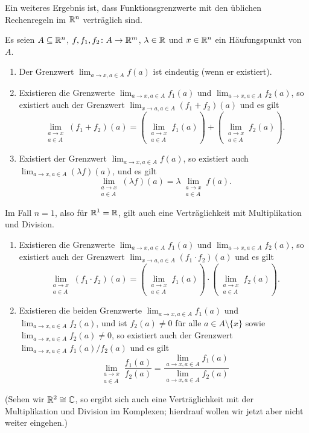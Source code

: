 \documentclass[a4paper,10pt]{article}
\begin{document}
Ein weiteres Ergebnis ist, dass Funktionsgrenzwerte mit den üblichen Rechenregeln im $\mathbb{R}^n$ verträglich sind.


\begin{prop}
 Es seien $A \subseteq \mathbb{R}^n$, $f, f_1, f_2 \colon A \to \mathbb{R}^m$, $\lambda \in \mathbb{R}$ und $x \in \mathbb{R}^n$ ein Häufungspunkt von $A$.
 \begin{enumerate}
  \item
   Der Grenzwert $\lim_{a \to x, a \in A} f(a)$ ist eindeutig (wenn er existiert).
  \item
   Existieren die Grenzwerte $\lim_{a \to x, a \in A} f_1(a)$ und $\lim_{a \to x, a \in A} f_2(a)$, so existiert auch der Grenzwert $\lim_{x \to a, a \in A} (f_1 + f_2)(a)$ und es gilt
   \[
    \lim_{\substack{a \to x \\ a \in A}} (f_1 + f_2)(a)
    =
    \left( \lim_{\substack{a \to x \\ a \in A}} f_1(a) \right)
    + \left( \lim_{\substack{a \to x \\ a \in A}} f_2(a) \right).
   \]
  \item
   Existiert der Grenzwert $\lim_{a \to x, a \in A} f(a)$, so existiert auch $\lim_{a \to x, a \in A} (\lambda f)(a)$, und es gilt
   \[
    \lim_{\substack{a \to x \\ a \in A}} (\lambda f)(a)
    = \lambda \lim_{\substack{a \to x \\ a \in A}} f(a).
   \]
 \end{enumerate}
 Im Fall $n = 1$, also für $\mathbb{R}^1 = \mathbb{R}$, gilt auch eine Verträglichkeit mit Multiplikation und Division.
 \begin{enumerate}[resume]
  \item
   Existieren die Grenzwerte $\lim_{a \to x, a \in A} f_1(a)$ und $\lim_{a \to x, a \in A} f_2(a)$, so existiert auch der Grenzwert $\lim_{x \to a, a \in A} (f_1 \cdot f_2)(a)$ und es gilt
   \[
    \lim_{\substack{a \to x \\ a \in A}} (f_1 \cdot f_2)(a)
    =
    \left( \lim_{\substack{a \to x \\ a \in A}} f_1(a) \right)
    \cdot \left( \lim_{\substack{a \to x \\ a \in A}} f_2(a) \right).
   \]
  \item
   Existieren die beiden Grenzwerte $\lim_{a \to x, a \in A} f_1(a)$ und $\lim_{a \to x, a \in A} f_2(a)$, und ist \mbox{$f_2(a) \neq 0$} für alle $a \in A \setminus \{x\}$ sowie $\lim_{a \to x, a \in A} f_2(a) \neq 0$, so existiert auch der Grenzwert $\lim_{a \to x, a \in A} f_1(a)/f_2(a)$ und es gilt
   \[
    \lim_{\substack{a \to x \\ a \in A}} \frac{f_1(a)}{f_2(a)}
    = \frac{\lim_{a \to x, a \in A} f_1(a)}{\lim_{a \to x, a \in A} f_2(a)}
   \]
 \end{enumerate}
 (Sehen wir $\mathbb{R}^2 \cong \mathbb{C}$, so ergibt sich auch eine Verträglichkeit mit der Multiplikation und Division im Komplexen; hierdrauf wollen wir jetzt aber nicht weiter eingehen.)
\end{prop}
\end{document}
